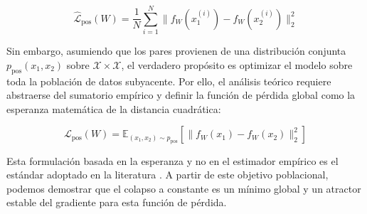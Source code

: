 \begin{equation}
\hat{\mathcal{L}}_{\text{pos}}(W) = \frac{1}{N} \sum_{i=1}^N \| f_W(x_1^{(i)}) - f_W(x_2^{(i)}) \|_2^2
\label{eq:L_pos_empirica}
\end{equation}

Sin embargo, asumiendo que los pares provienen de una distribución conjunta $p_{\text{pos}}(x_1, x_2)$ sobre $\mathcal{X} \times \mathcal{X}$, el verdadero propósito es optimizar el modelo sobre toda la población de datos subyacente. Por ello, el análisis teórico requiere abstraerse del sumatorio empírico y definir la función de pérdida global como la esperanza matemática de la distancia cuadrática:

\begin{equation}
\mathcal{L}_{\text{pos}}(W) = \mathbb{E}_{(x_1, x_2) \sim p_{\text{pos}}} \left[ \| f_W(x_1) - f_W(x_2) \|_2^2 \right]
\label{eq:L_pos}
\end{equation}

Esta formulación basada en la esperanza y no en el estimador empírico es el estándar adoptado en la literatura \cite{wang2020understanding}. A partir de este objetivo poblacional, podemos demostrar que el colapso a constante es un mínimo global y un atractor estable del gradiente para esta función de pérdida.

